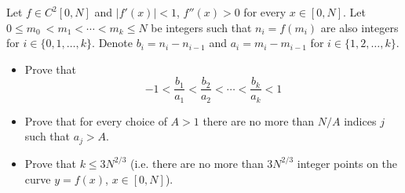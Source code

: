 Let \(f\in C^2[0,N]\) and \(|f'(x)|<1\), \(f''(x)>0\) for every \(x\in [0, N]\). Let \(0\leq m_0\ <m_1 < \cdots < m_k\leq N\) be integers such that \(n_i=f(m_i)\) are also integers for \(i\in\{0,1,\ldots, k\}\). Denote \(b_i=n_i-n_{i-1}\) and \(a_i=m_i-m_{i-1}\) for \(i\in\{1,2,\ldots, k\}\).
\begin{itemize}

\item[(a)] Prove that
\[-1<\frac{b_1}{a_1}<\frac{b_2}{a_2}<\cdots < \frac{b_k}{a_k}<1\]
\item[(b)] Prove that for every choice of \(A>1\) there are no more than \(N / A\) indices \(j\) such that \(a_j>A\).

\item[(c)] Prove that \(k\leq 3N^{2/3}\) (i.e. there are no more than \(3N^{2/3}\) integer points on the curve \(y=f(x)\), \(x\in [0,N]\)).
\end{itemize}
